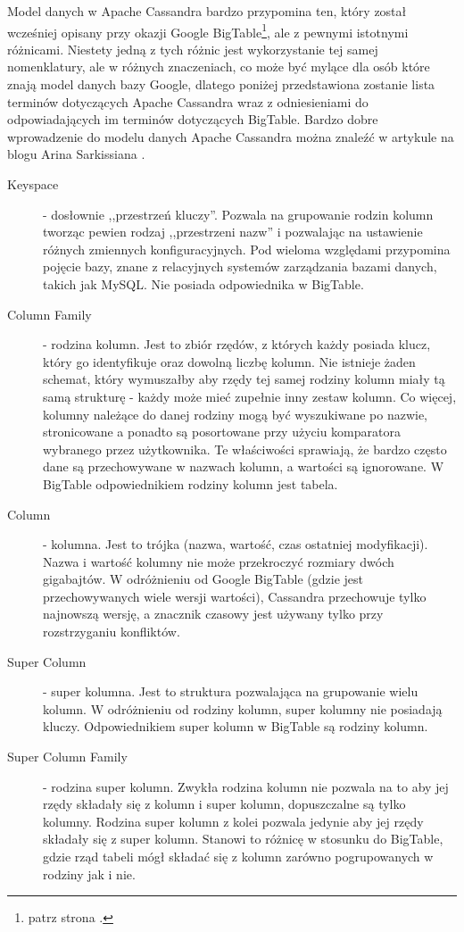 Model danych w Apache Cassandra bardzo przypomina ten, który został wcześniej opisany przy okazji Google BigTable\footnote{patrz strona \pageref{google-bigtable-model-danych}.}, ale z pewnymi istotnymi różnicami.
Niestety jedną z tych różnic jest wykorzystanie tej samej nomenklatury, ale w różnych znaczeniach, co może być mylące dla osób które znają model danych bazy Google, dlatego poniżej przedstawiona zostanie lista terminów dotyczących Apache Cassandra wraz z odniesieniami do odpowiadających im terminów dotyczących BigTable.
Bardzo dobre wprowadzenie do modelu danych Apache Cassandra można znaleźć w artykule na blogu Arina Sarkissiana \cite{arin-wtf-is-a-supercolumn}.

\begin{description}
 \item[Keyspace] - dosłownie ,,przestrzeń kluczy''.
 Pozwala na grupowanie rodzin kolumn tworząc pewien rodzaj ,,przestrzeni nazw'' i pozwalając na ustawienie różnych zmiennych konfiguracyjnych.
 Pod wieloma względami przypomina pojęcie bazy, znane z relacyjnych systemów zarządzania bazami danych, takich jak MySQL.
 Nie posiada odpowiednika w BigTable.

 \item[Column Family] - rodzina kolumn.
 Jest to zbiór rzędów, z których każdy posiada klucz, który go identyfikuje oraz dowolną liczbę kolumn.
 Nie istnieje żaden schemat, który wymuszałby aby rzędy tej samej rodziny kolumn miały tą samą strukturę - każdy może mieć zupełnie inny zestaw kolumn.
 Co więcej, kolumny należące do danej rodziny mogą być wyszukiwane po nazwie, stronicowane a ponadto są posortowane przy użyciu komparatora wybranego przez użytkownika.
 Te właściwości sprawiają, że bardzo często dane są przechowywane w nazwach kolumn, a wartości są ignorowane.
 W BigTable odpowiednikiem rodziny kolumn jest tabela.

 \item[Column] - kolumna.
 Jest to trójka (nazwa, wartość, czas ostatniej modyfikacji).
 Nazwa i wartość kolumny nie może przekroczyć rozmiary dwóch gigabajtów.
 W odróżnieniu od Google BigTable (gdzie jest przechowywanych wiele wersji wartości), Cassandra przechowuje tylko najnowszą wersję, a znacznik czasowy jest używany tylko przy rozstrzyganiu konfliktów.

 \item[Super Column] - super kolumna.
 Jest to struktura pozwalająca na grupowanie wielu kolumn.
 W odróżnieniu od rodziny kolumn, super kolumny nie posiadają kluczy.
 Odpowiednikiem super kolumn w BigTable są rodziny kolumn.

 \item[Super Column Family] - rodzina super kolumn.
 Zwykła rodzina kolumn nie pozwala na to aby jej rzędy składały się z kolumn i super kolumn, dopuszczalne są tylko kolumny.
 Rodzina super kolumn z kolei pozwala jedynie aby jej rzędy składały się z super kolumn.
 Stanowi to różnicę w stosunku do BigTable, gdzie rząd tabeli mógł składać się z kolumn zarówno pogrupowanych w rodziny jak i nie.
\end{description}

